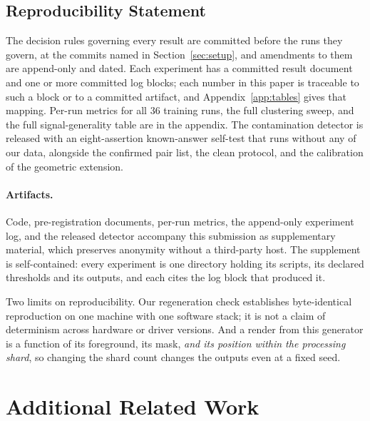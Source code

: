 \documentclass{article} %
\begin{document}
\subsection*{Reproducibility Statement}

The decision rules governing every result are committed before the runs they govern, at the commits
named in Section~\ref{sec:setup}, and amendments to them are append-only and dated. Each experiment
has a committed result document and one or more committed log blocks; each number in this paper is
traceable to such a block or to a committed artifact, and Appendix~\ref{app:tables} gives that
mapping. Per-run metrics for all $36$ training runs, the full clustering sweep, and the full
signal-generality table are in the appendix. The contamination detector is released with an
eight-assertion known-answer self-test that runs without any of our data, alongside the confirmed
pair list, the clean protocol, and the calibration of the geometric extension.

\paragraph{Artifacts.} Code, pre-registration documents, per-run metrics, the append-only experiment
log, and the released detector accompany this submission as supplementary material, which preserves
anonymity without a third-party host.
The supplement is self-contained: every experiment is one directory holding its
scripts, its declared thresholds and its outputs, and each cites the log block that produced it.

Two limits on reproducibility. Our regeneration check
establishes byte-identical reproduction on one machine with one software stack; it is not a claim of
determinism across hardware or driver versions. And a render from this generator is a function of its
foreground, its mask, \emph{and its position within the processing shard}, so changing the shard count
changes the outputs even at a fixed seed.

\appendix

\section{Additional Related Work}
\label{app:related}
\end{document}
